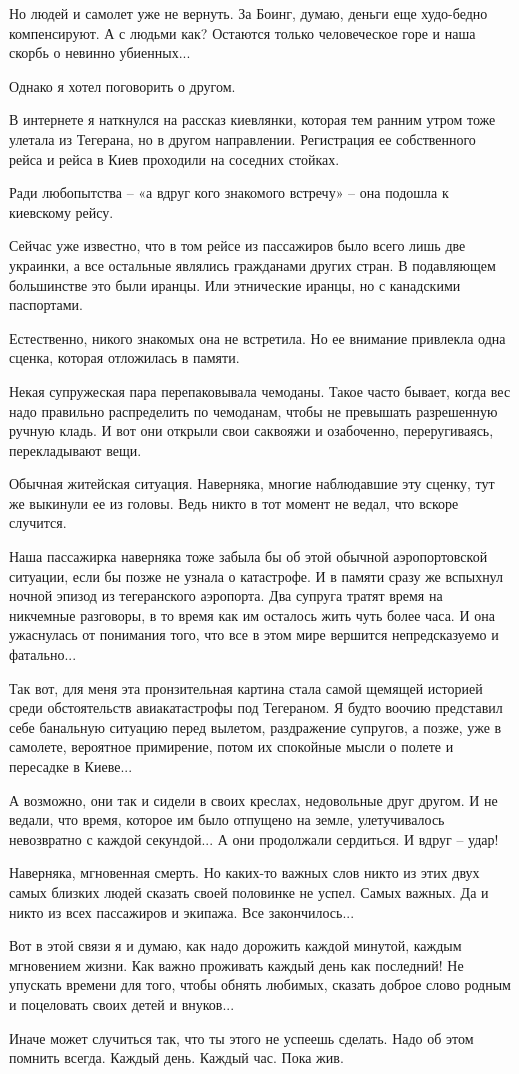 Но людей и самолет уже не вернуть. За Боинг, думаю, деньги еще худо-бедно
компенсируют. А с людьми как? Остаются только человеческое горе и наша
скорбь о невинно убиенных...

Однако я хотел поговорить о другом.

В интернете я наткнулся на рассказ киевлянки, которая тем ранним утром
тоже улетала из Тегерана, но в другом направлении. Регистрация ее
собственного рейса и рейса в Киев проходили на соседних стойках.

Ради любопытства – «а вдруг кого знакомого встречу» – она подошла к
киевскому рейсу.

Сейчас уже известно, что в том рейсе из пассажиров было всего лишь две
украинки, а все остальные являлись гражданами других стран. В подавляющем
большинстве это были иранцы. Или этнические иранцы, но с канадскими
паспортами.

Естественно, никого знакомых она не встретила. Но ее внимание привлекла
одна сценка, которая отложилась в памяти.

Некая супружеская пара перепаковывала чемоданы. Такое часто бывает, когда
вес надо правильно распределить по чемоданам, чтобы не превышать
разрешенную ручную кладь. И вот они открыли свои саквояжи и озабоченно,
переругиваясь, перекладывают вещи.

Обычная житейская ситуация. Наверняка, многие наблюдавшие эту сценку, тут
же выкинули ее из головы.  Ведь никто в тот момент не ведал, что вскоре
случится.

Наша пассажирка наверняка тоже забыла бы об этой обычной аэропортовской
ситуации, если бы позже не узнала о катастрофе. И в памяти сразу же
вспыхнул ночной эпизод из тегеранского аэропорта. Два супруга тратят
время на никчемные разговоры, в то время как им осталось жить чуть более
часа. И она ужаснулась от понимания того, что все в этом мире вершится
непредсказуемо и фатально...

Так вот, для меня эта пронзительная картина стала самой щемящей историей
среди обстоятельств авиакатастрофы под Тегераном. Я будто воочию
представил себе банальную ситуацию перед вылетом, раздражение супругов, а
позже, уже в самолете, вероятное примирение, потом их спокойные мысли о
полете и пересадке в Киеве...

А возможно, они так и сидели в своих креслах, недовольные друг другом. И
не ведали, что время, которое им было отпущено на земле, улетучивалось
невозвратно с каждой секундой... А они продолжали сердиться. И вдруг  –
удар!

Наверняка, мгновенная смерть. Но каких-то важных слов никто из этих двух
самых близких людей сказать своей половинке не успел. Самых важных. Да и
никто из всех пассажиров и экипажа. Все закончилось...

Вот в этой связи я и думаю, как надо дорожить каждой минутой, каждым
мгновением жизни. Как важно проживать каждый день как последний! Не
упускать времени для того, чтобы обнять любимых, сказать доброе слово
родным и поцеловать своих детей и внуков...

Иначе может случиться так, что ты этого не успеешь сделать. Надо об этом
помнить всегда. Каждый день. Каждый час. Пока жив.

